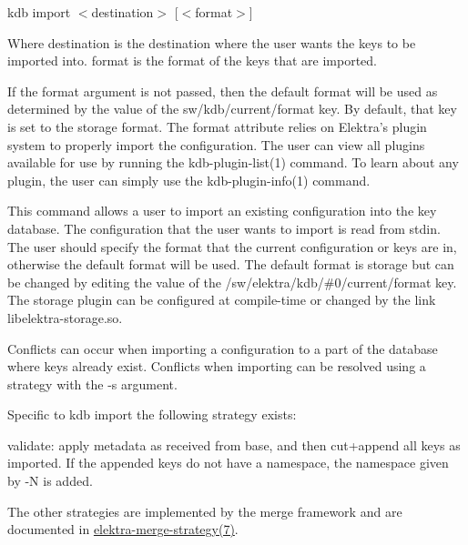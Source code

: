 {\ttfamily kdb import $<$destination$>$ \mbox{[}$<$format$>$\mbox{]}}

Where {\ttfamily destination} is the destination where the user wants the keys to be imported into. {\ttfamily format} is the format of the keys that are imported.

If the {\ttfamily format} argument is not passed, then the default format will be used as determined by the value of the {\ttfamily sw/kdb/current/format} key. By default, that key is set to the {\ttfamily storage} format. The {\ttfamily format} attribute relies on Elektra’s plugin system to properly import the configuration. The user can view all plugins available for use by running the kdb-\/plugin-\/list(1) command. To learn about any plugin, the user can simply use the kdb-\/plugin-\/info(1) command.

This command allows a user to import an existing configuration into the key database. The configuration that the user wants to import is read from {\ttfamily stdin}. The user should specify the format that the current configuration or keys are in, otherwise the default format will be used. The default format is {\ttfamily storage} but can be changed by editing the value of the {\ttfamily /sw/elektra/kdb/\#0/current/format} key. The {\ttfamily storage} plugin can be configured at compile-\/time or changed by the link {\ttfamily libelektra-\/storage.\+so}.

Conflicts can occur when importing a configuration to a part of the database where keys already exist. Conflicts when importing can be resolved using a strategy with the {\ttfamily -\/s} argument.

Specific to {\ttfamily kdb import} the following strategy exists\+:


\begin{DoxyItemize}
\item {\ttfamily validate}\+: apply metadata as received from base, and then cut+append all keys as imported. If the appended keys do not have a namespace, the namespace given by {\ttfamily -\/N} is added.
\end{DoxyItemize}

The other strategies are implemented by the merge framework and are documented in \mbox{\hyperlink{doc_help_elektra-merge-strategy_md}{elektra-\/merge-\/strategy(7)}}.



